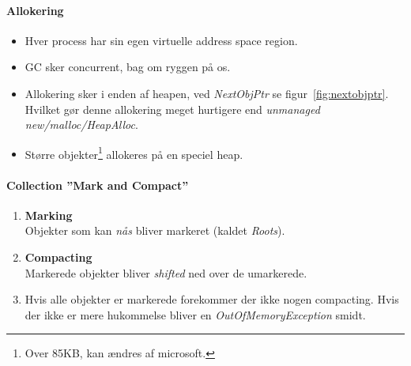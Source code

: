 \paragraph{Allokering}
\begin{itemize}
	\item Hver process har sin egen virtuelle address space region.
	\item GC sker concurrent, bag om ryggen på os.
	\item Allokering sker i enden af heapen, ved \textit{NextObjPtr} se figur~\ref{fig:nextobjptr}. Hvilket gør denne allokering meget hurtigere end \textit{unmanaged} \textit{new/malloc/HeapAlloc}.
	\item Større objekter\footnote{Over 85KB, kan ændres af microsoft.} allokeres på en speciel heap.
\end{itemize}

\paragraph{Collection ''Mark and Compact''}
\begin{enumerate}
	\item \textbf{Marking}\\
	Objekter som kan \textit{nås} bliver markeret (kaldet \textit{Roots}).
	\item \textbf{Compacting}\\
	Markerede objekter bliver \textit{shifted} ned over de umarkerede.
	\item Hvis alle objekter er markerede forekommer der ikke nogen compacting. Hvis der ikke er mere hukommelse bliver en \textit{OutOfMemoryException} smidt.
\end{enumerate}

